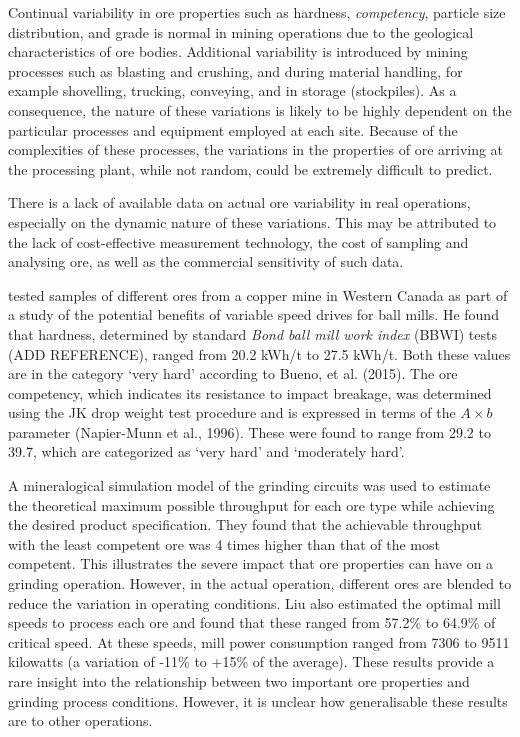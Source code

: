 Continual variability in ore properties such as hardness, \textit{competency}, particle size distribution, and grade is normal in mining operations due to the geological characteristics of ore bodies. Additional variability is introduced by mining processes such as blasting and crushing, and during material handling, for example shovelling, trucking, conveying, and in storage (stockpiles). As a consequence, the nature of these variations is likely to be highly dependent on the particular processes and equipment employed at each site. Because of the complexities of these processes, the variations in the properties of ore arriving at the processing plant, while not random, could be extremely difficult to predict.

There is a lack of available data on actual ore variability in real operations, especially on the dynamic nature of these variations. This may be attributed to the lack of cost-effective measurement technology, the cost of sampling and analysing ore, as well as the commercial sensitivity of such data.

\cite{liu_development_2018} tested samples of different ores from a copper mine in Western Canada as part of a study of the potential benefits of variable speed drives for ball mills. He found that hardness, determined by standard \textit{Bond ball mill work index} (BBWI) tests  (ADD REFERENCE), ranged from 20.2 kWh/t to 27.5 kWh/t. Both these values are in the category `very hard' according to Bueno, et al. (2015). The ore competency, which indicates its resistance to impact breakage, was determined using the JK drop weight test procedure and is expressed in terms of the $A\times{b}$ parameter (Napier-Munn et al., 1996). These were found to range from 29.2 to 39.7, which are categorized as `very hard' and `moderately hard'.

A mineralogical simulation model of the grinding circuits was used to estimate the theoretical maximum possible throughput for each ore type while achieving the desired product specification. They found that the achievable throughput with the least competent ore was 4 times higher than that of the most competent. This illustrates the severe impact that ore properties can have on a grinding operation. However, in the actual operation, different ores are blended to reduce the variation in operating conditions. Liu also estimated the optimal mill speeds to process each ore and found that these ranged from 57.2\% to 64.9\% of critical speed. At these speeds, mill power consumption ranged from 7306 to 9511 kilowatts (a variation of -11\% to +15\% of the average). These results provide a rare insight into the relationship between two important ore properties and grinding process conditions. However, it is unclear how generalisable these results are to other operations.


